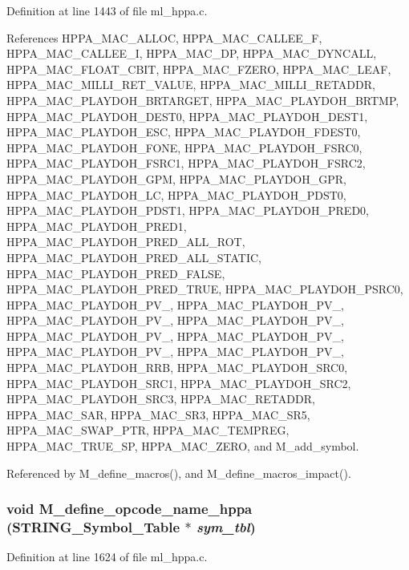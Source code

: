 Definition at line 1443 of file ml\_\-hppa.c.

References HPPA\_\-MAC\_\-ALLOC, HPPA\_\-MAC\_\-CALLEE\_\-F, HPPA\_\-MAC\_\-CALLEE\_\-I, HPPA\_\-MAC\_\-DP, HPPA\_\-MAC\_\-DYNCALL, HPPA\_\-MAC\_\-FLOAT\_\-CBIT, HPPA\_\-MAC\_\-FZERO, HPPA\_\-MAC\_\-LEAF, HPPA\_\-MAC\_\-MILLI\_\-RET\_\-VALUE, HPPA\_\-MAC\_\-MILLI\_\-RETADDR, HPPA\_\-MAC\_\-PLAYDOH\_\-BRTARGET, HPPA\_\-MAC\_\-PLAYDOH\_\-BRTMP, HPPA\_\-MAC\_\-PLAYDOH\_\-DEST0, HPPA\_\-MAC\_\-PLAYDOH\_\-DEST1, HPPA\_\-MAC\_\-PLAYDOH\_\-ESC, HPPA\_\-MAC\_\-PLAYDOH\_\-FDEST0, HPPA\_\-MAC\_\-PLAYDOH\_\-FONE, HPPA\_\-MAC\_\-PLAYDOH\_\-FSRC0, HPPA\_\-MAC\_\-PLAYDOH\_\-FSRC1, HPPA\_\-MAC\_\-PLAYDOH\_\-FSRC2, HPPA\_\-MAC\_\-PLAYDOH\_\-GPM, HPPA\_\-MAC\_\-PLAYDOH\_\-GPR, HPPA\_\-MAC\_\-PLAYDOH\_\-LC, HPPA\_\-MAC\_\-PLAYDOH\_\-PDST0, HPPA\_\-MAC\_\-PLAYDOH\_\-PDST1, HPPA\_\-MAC\_\-PLAYDOH\_\-PRED0, HPPA\_\-MAC\_\-PLAYDOH\_\-PRED1, HPPA\_\-MAC\_\-PLAYDOH\_\-PRED\_\-ALL\_\-ROT, HPPA\_\-MAC\_\-PLAYDOH\_\-PRED\_\-ALL\_\-STATIC, HPPA\_\-MAC\_\-PLAYDOH\_\-PRED\_\-FALSE, HPPA\_\-MAC\_\-PLAYDOH\_\-PRED\_\-TRUE, HPPA\_\-MAC\_\-PLAYDOH\_\-PSRC0, HPPA\_\-MAC\_\-PLAYDOH\_\-PV\_, HPPA\_\-MAC\_\-PLAYDOH\_\-PV\_, HPPA\_\-MAC\_\-PLAYDOH\_\-PV\_, HPPA\_\-MAC\_\-PLAYDOH\_\-PV\_, HPPA\_\-MAC\_\-PLAYDOH\_\-PV\_, HPPA\_\-MAC\_\-PLAYDOH\_\-PV\_, HPPA\_\-MAC\_\-PLAYDOH\_\-PV\_, HPPA\_\-MAC\_\-PLAYDOH\_\-PV\_, HPPA\_\-MAC\_\-PLAYDOH\_\-RRB, HPPA\_\-MAC\_\-PLAYDOH\_\-SRC0, HPPA\_\-MAC\_\-PLAYDOH\_\-SRC1, HPPA\_\-MAC\_\-PLAYDOH\_\-SRC2, HPPA\_\-MAC\_\-PLAYDOH\_\-SRC3, HPPA\_\-MAC\_\-RETADDR, HPPA\_\-MAC\_\-SAR, HPPA\_\-MAC\_\-SR3, HPPA\_\-MAC\_\-SR5, HPPA\_\-MAC\_\-SWAP\_\-PTR, HPPA\_\-MAC\_\-TEMPREG, HPPA\_\-MAC\_\-TRUE\_\-SP, HPPA\_\-MAC\_\-ZERO, and M\_\-add\_\-symbol.

Referenced by M\_\-define\_\-macros(), and M\_\-define\_\-macros\_\-impact().
\subsubsection{\setlength{\rightskip}{0pt plus 5cm}void M\_\-define\_\-opcode\_\-name\_\-hppa (\bf{STRING\_\-Symbol\_\-Table} $\ast$ {\em sym\_\-tbl})}\label{ml__hppa_8c_ab0d3979f76e536bdffa06ab59a0d244}




Definition at line 1624 of file ml\_\-hppa.c.

